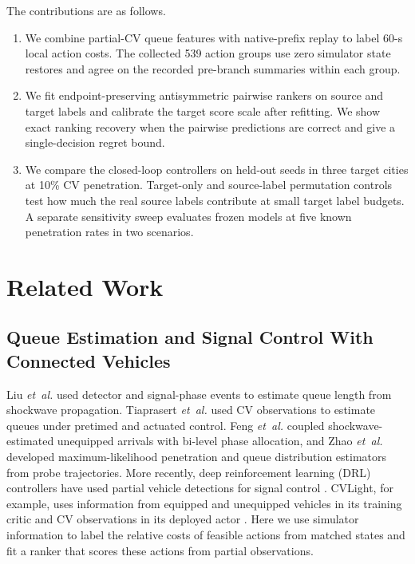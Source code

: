 \documentclass[letterpaper,journal]{IEEEtran}
\begin{document}
The contributions are as follows.
\begin{enumerate}
    \item We combine partial-CV queue features with native-prefix replay to label 60-s local action costs. The collected 539 action groups use zero simulator state restores and agree on the recorded pre-branch summaries within each group.
    \item We fit endpoint-preserving antisymmetric pairwise rankers on source and target labels and calibrate the target score scale after refitting. We show exact ranking recovery when the pairwise predictions are correct and give a single-decision regret bound.
    \item We compare the closed-loop controllers on held-out seeds in three target cities at 10\% CV penetration. Target-only and source-label permutation controls test how much the real source labels contribute at small target label budgets. A separate sensitivity sweep evaluates frozen models at five known penetration rates in two scenarios.
\end{enumerate}

\section{Related Work}
\label{sec:related}

\subsection{Queue Estimation and Signal Control With Connected Vehicles}
Liu \emph{et~al.} \cite{liu2009realtime} used detector and signal-phase events to estimate queue length from shockwave propagation. Tiaprasert \emph{et~al.} \cite{tiaprasert2015queue} used CV observations to estimate queues under pretimed and actuated control. Feng \emph{et~al.} \cite{feng2015realtime} coupled shockwave-estimated unequipped arrivals with bi-level phase allocation, and Zhao \emph{et~al.} \cite{zhao2022maximum} developed maximum-likelihood penetration and queue distribution estimators from probe trajectories. More recently, deep reinforcement learning (DRL) controllers have used partial vehicle detections for signal control \cite{zhang2021partial,mo2022cvlight}. CVLight, for example, uses information from equipped and unequipped vehicles in its training critic and CV observations in its deployed actor \cite{mo2022cvlight}. Here we use simulator information to label the relative costs of feasible actions from matched states and fit a ranker that scores these actions from partial observations.
\end{document}
